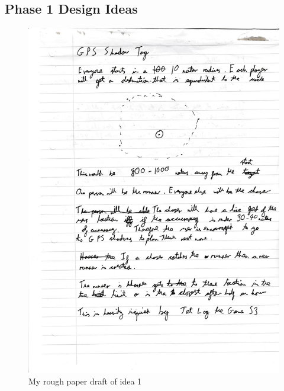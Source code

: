 \documentclass{l4proj}
\begin{document}
%
% 

\begin{appendices}

\chapter{Phase 1 Design Ideas}

\begin{figure}
    \centering
    \includegraphics[width=\linewidth]{images/idea1.pdf} 
    \caption{My rough paper draft of idea 1}
    \label{fig:idea1}
\end{figure}
\begin{figure}

\end{figure}
\end{appendices}
\end{document}
